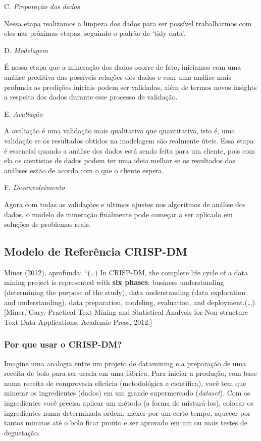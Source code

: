 \documentclass[]{article}
\begin{document}
C. \emph{Preparação dos dados}

Nessa etapa realizamos a limpeza dos dados para ser possível
trabalharmos com eles nas próximas etapas, seguindo o padrão de `tidy
data'.

D. \emph{Modelagem}

É nessa etapa que a mineração dos dados ocorre de fato, iniciamos com
uma análise preditiva das possíveis relações dos dados e com uma análise
mais profunda as predições iniciais podem ser validadas, além de termos
novos insights a respeito dos dados durante esse processo de validação.

E. \emph{Avaliação}

A avaliação é uma validação mais qualitativa que quantitativa, isto é,
uma validação se os resultados obtidos na modelagem são realmente úteis.
Essa etapa é essencial quando a análise dos dados está sendo feita para
um cliente, pois com ela os cientistas de dados podem ter uma ideia
melhor se os resultados das análises estão de acordo com o que o cliente
espera.

F. \emph{Desenvolvimento}

Agora com todas as validações e ultimos ajustes nos algoritmos de
análise dos dados, o modelo de mineração finalmente pode começar a ser
aplicado em soluções de problemas reais.

\subsection{Modelo de Referência
CRISP-DM}\label{modelo-de-referencia-crisp-dm}

Miner (2012), aprofunda: ``(\ldots{}) In CRISP-DM, the complete life
cycle of a data mining project is represented with \textbf{six phases}:
business understanding (determining the purpose of the study), data
understanding (data exploration and understanding), data preparation,
modeling, evaluation, and deployment.(\ldots{}). {[}Miner, Gary.
Practical Text Mining and Statistical Analysis for Non-structure Text
Data Applications. Academic Press, 2012.{]}

\subsubsection{Por que usar o CRISP-DM?}\label{por-que-usar-o-crisp-dm}

Imagine uma analogia entre um projeto de datamining e a preparação de
uma receita de bolo para ser usada em uma fábrica. Para iniciar a
produção, com base numa receita de comprovada eficácia (metodológica e
científica), você tem que minerar os ingredientes (dados) em um grande
supermercado (\emph{dataset}). Com os ingredientes você precisa aplicar
um método (a forma de misturá-los), colocar os ingredientes numa
determinada ordem, mexer por um certo tempo, aquecer por tantos minutos
até o bolo ficar pronto e ser aprovado em um ou mais testes de
degustação.
\end{document}
